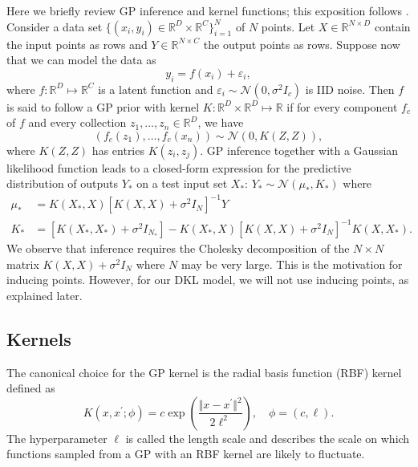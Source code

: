 \documentclass{article}
\newcommand{\RR}{\mathbb{R}}
\newcommand{\calN}{\mathcal{N}}
\newcommand{\eps}{\varepsilon}
\newcommand{\sig}{\sigma}
\begin{document}
Here we briefly review GP inference and kernel functions; this exposition follows \citet{gpml}. Consider a data set $\{(x_i, y_i)\in \RR^D\times \RR^C\}_{i=1}^N$ of $N$ points. Let $X\in \RR^{N\times D}$ contain the input points as rows and $Y\in \RR^{N\times C}$ the output points as rows. Suppose now that we can model the data as
\[ y_i = f(x_i) + \eps_i, \]
where $f:\RR^D\mapsto\RR^C$ is a latent function and $\eps_i\sim\calN(0, \sig^2 I_c)$ is IID noise. Then $f$ is said to follow a GP prior with kernel $K:\RR^D\times\RR^D\mapsto \RR$ if for every component $f_c$ of $f$ and every collection $z_1,\ldots,z_n\in\RR^D$, we have
\begin{equation}
(f_c(z_1), \ldots, f_c(x_n)) \sim \calN(0, K(Z, Z)),
\end{equation}
where $K(Z, Z)$ has entries $K(z_i, z_j)$. GP inference together with a Gaussian likelihood function leads to a closed-form expression for the predictive distribution of outputs $Y_*$ on a test input set $X_*$: $Y_*\sim\calN(\mu_*, K_*)$ where
\begin{align}
\label{eq-ppd-mu}
\mu_* &= K(X_*, X)[K(X, X)+\sig^2 I_N]^{-1} Y \\
\label{eq-ppd-K}
K_* &= [K(X_*, X_*)+\sig^2 I_{N_*}] - K(X_*, X) [K(X, X)+\sig^2 I_N]^{-1} K(X, X_*).
\end{align}
We observe that inference requires the Cholesky decomposition of the $N\times N$ matrix $K(X, X)+\sig^2 I_N$ where $N$ may be very large. This is the motivation for inducing points. However, for our DKL model, we will not use inducing points, as explained later.

\subsection{Kernels}

The canonical choice for the GP kernel is the radial basis function (RBF) kernel defined as
\begin{equation}
K(x, x^\prime; \phi) = c\exp\left(\frac{\Vert x-x^\prime\Vert^2}{2\ell^2}\right),
\quad \phi = (c, \ell).
\end{equation}
The hyperparameter $\ell$ is called the length scale and describes the scale on which functions sampled from a GP with an RBF kernel are likely to fluctuate.
\end{document}
